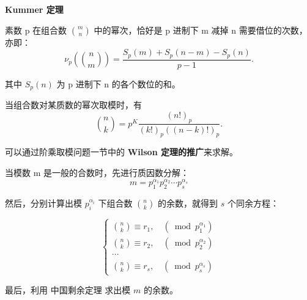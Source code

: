 \documentclass[UTF8]{article}
\begin{document}
\noindent \textbf{Kummer 定理}

素数 p 在组合数 $\binom{m}{n}$ 中的幂次，恰好是 p 进制下 m 减掉 n 需要借位的次数，亦即：
$$
\nu_p\left(\binom{n}{m}\right)=\frac{S_p(m)+S_p(n - m)-S_p(n)}{p-1} .
$$

其中 $S_p(n)$ 为 p 进制下 n 的各个数位的和。

当组合数对某质数的幂次取模时，有
$$
\binom{n}{k}=p^K \frac{(n!)_p}{(k!)_p((n-k)!)_p} .
$$

可以通过阶乘取模问题一节中的 \textbf{Wilson 定理的推广}来求解。

当模数 $\mathrm{m}$ 是一般的合数时，先进行质因数分解：
$$
m=p_1^{\alpha_1} p_2^{\alpha_2} \cdots p_s^{\alpha_s}
$$

然后，分别计算出模 $p_i^{\alpha_i}$ 下组合数 $\binom{n}{k}$ 的余数，就得到 $s$ 个同余方程：

$$
\left\{\begin{array}{l}
\binom{n}{k} \equiv r_1, \quad\left(\bmod p_1^{\alpha_1}\right) \\
\binom{n}{k} \equiv r_2, \quad\left(\bmod p_2^{\alpha_2}\right) \\
\cdots \\
\binom{n}{k} \equiv r_s, \quad\left(\bmod p_s^{\alpha_s}\right)
\end{array}\right.
$$

最后，利用 中国剩余定理 求出模 $m$ 的余数。
\end{document}
